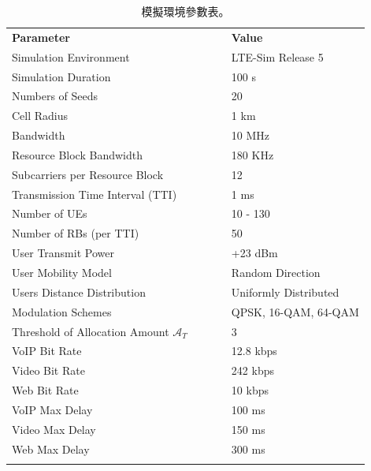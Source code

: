 \begin{table}[H]
\centering
\caption{模擬環境參數表。}
\vskip 10pt
\label{tab:Sim_parameters}
\begin{tabular}{lllll}
\textbf{Parameter}       &  &  &  & \textbf{Value}   \\ \thickhline
Simulation Environment   &  &  &  & LTE-Sim Release 5\\
Simulation Duration      &  &  &  & 100 s            \\
Numbers of Seeds         &  &  &  & 20               \\
Cell Radius              &  &  &  & 1 km             \\
Bandwidth                &  &  &  & 10 MHz           \\
Resource Block Bandwidth &  &  &  & 180 KHz          \\
Subcarriers per Resource Block &  &  &  & 12         \\
Transmission Time Interval (TTI)&  &  &  & 1 ms      \\
Number of UEs            &  &  &  & 10 - 130         \\
Number of RBs (per TTI)  &  &  &  & 50               \\
User Transmit Power		 &  &  &  & +23 dBm          \\
User Mobility Model		 &  &  &  & Random Direction \\
Users Distance Distribution&  &  &  & Uniformly Distributed \\
Modulation Schemes       &  &  &  & QPSK, 16-QAM, 64-QAM \\
Threshold of Allocation Amount $\mathcal{A}_T$     &  &  &  & 3 \\
VoIP Bit Rate            &  &  &  & 12.8 kbps      	 \\
Video Bit Rate           &  &  &  & 242 kbps         \\
Web Bit Rate             &  &  &  & 10 kbps          \\
VoIP Max Delay           &  &  &  & 100 ms           \\
Video Max Delay          &  &  &  & 150 ms           \\
Web Max Delay            &  &  &  & 300 ms           \\ \thickhline
\end{tabular}
\end{table}


